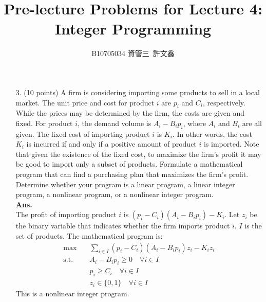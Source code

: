 \documentclass[12pt]{article}
\title{Pre-lecture Problems for Lecture 4:\\ Integer Programming}
\author{B10705034 資管三\ 許文鑫}
\begin{document}
\maketitle
\begin{enumerate}
    \item[3.](10 points) A firm is considering importing some products to sell in a local market. The unit price and cost for product $i$ are $p_i$ and $C_i$, respectively. While the prices may be determined by the firm, the costs are given and fixed. For product $i$, the demand volume is $A_i - B_ip_i$, where $A_i$ and $B_i$ are all given. The fixed cost of importing product $i$ is $K_i$. In other words, the cost $K_i$ is incurred if and only if a positive amount of product $i$ is imported. Note that given the existence of the fixed cost, to maximize the firm’s profit it may be good to import only a subset of products. Formulate a mathematical program that can find a purchasing plan that maximizes the firm's profit. Determine whether your program is a linear program, a linear integer program, a nonlinear program, or a nonlinear integer program.\\
    \textbf{Ans. }\\
    The profit of importing product $i$ is $(p_i-C_i)(A_i - B_ip_i) - K_i$. Let $z_i$ be the binary variable that indicates whether the firm imports product $i$. $I$ is the set of products. The mathematical program is:
    \begin{align*}
        \max \quad & \sum_{i\in I}(p_i - C_i)(A_i - B_ip_i)z_i - K_iz_i \\
        \text{s.t.} \quad
                   & A_i - B_ip_i \geq 0 \quad \forall i\in I           \\
                   & p_i \geq C_i \quad \forall i\in I                  \\
                   & z_i \in \{0,1\} \quad \forall i\in I
    \end{align*}
    This is a nonlinear integer program.
\end{enumerate}
\end{document}
